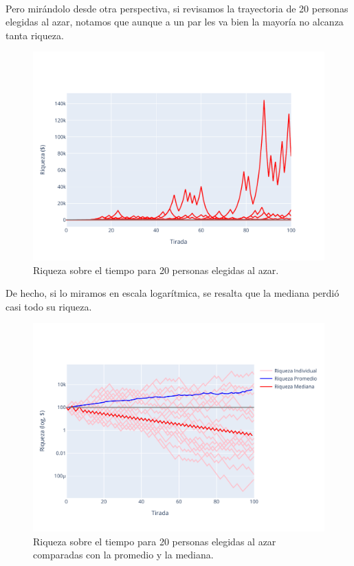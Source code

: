 \documentclass[../main.tex]{subfiles}
\begin{document}
\paragraph{} Pero mirándolo desde otra perspectiva, si revisamos la trayectoria de 20 personas elegidas al azar, notamos que aunque a un par les va bien la mayoría no alcanza tanta riqueza.

\begin{figure}[H]
  \centering
  \includegraphics[scale=0.7]{img/paths.pdf}
  \caption{Riqueza sobre el tiempo para 20 personas elegidas al azar.}
\end{figure}

De hecho, si lo miramos en escala logarítmica, se resalta que la mediana perdió casi todo su riqueza.

\begin{figure}[H]
  \centering
  \includegraphics[scale=0.7]{img/logPaths.pdf}
  \caption{Riqueza sobre el tiempo para 20 personas elegidas al azar comparadas con la promedio y la mediana.}
\end{figure}
\end{document}
